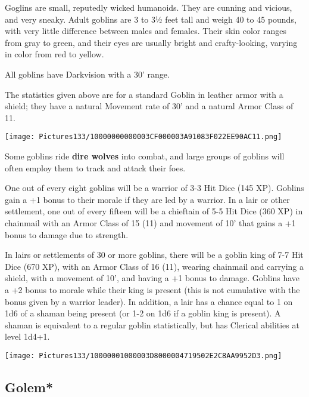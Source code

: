 \documentclass[a4paper,twoside,openany,10pt]{book}
\begin{document}
\begin{multicols}{2}
Goglins are small, reputedly wicked humanoids. They are cunning and vicious, and very sneaky. Adult goblins are 3 to 3½ feet tall and weigh 40 to 45 pounds, with very little difference between males and females. Their skin color ranges from gray to green, and their eyes are usually bright and crafty-looking, varying in color from red to yellow.

All goblins have Darkvision with a 30' range.

The statistics given above are for a standard Goblin in leather armor with a shield; they have a natural Movement rate of 30' and a natural Armor Class of 11.

\begin{center}
	\texttt{[image: Pictures133/10000000000003CF000003A91083F022EE90AC11.png]}
\end{center}

Some goblins ride \textbf{dire wolves} into combat, and large groups of goblins will often employ them to track and attack their foes.

One out of every eight goblins will be a warrior of 3-3 Hit Dice (145 XP). Goblins gain a +1 bonus to their morale if they are led by a warrior. In a lair or other settlement, one out of every fifteen will be a chieftain of 5-5 Hit Dice (360 XP) in chainmail with an Armor Class of 15 (11) and movement of 10' that gains a +1 bonus to damage due to strength. 


In lairs or settlements of 30 or more goblins, there will be a goblin king of 7-7 Hit Dice (670 XP), with an Armor Class of 16 (11), wearing chainmail and carrying a shield, with a movement of 10', and having a +1 bonus to damage. Goblins have a +2 bonus to morale while their king is present (this is not cumulative with the bonus given by a warrior leader). In addition, a lair has a chance equal to 1 on 1d6 of a shaman being present (or 1-2 on 1d6 if a goblin king is present). A shaman is equivalent to a regular goblin statistically, but has Clerical abilities at level 1d4+1.


\begin{center}
	\texttt{[image: Pictures133/10000001000003D8000004719502E2C8AA9952D3.png]}
\end{center}

\columnbreak


\subsection*{Golem*}\label{golem}


\end{multicols}
\end{document}
